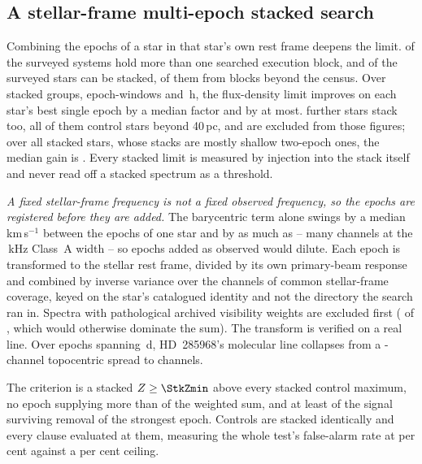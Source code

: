 \subsection{A stellar-frame multi-epoch stacked search}
\label{sec:stack}

Combining the epochs of a star in that star's own rest frame deepens the
limit. \EpMulti{} of the \NSystems{} surveyed systems hold more than one
searched execution block, and \SxStkStarCensus{} of the surveyed stars can be
stacked, \SttNStkOneEb{} of them from blocks beyond the census. Over \SyStkNGroup{} stacked groups, \SyStkNEpochComb{} epoch-windows and
\SyStkHours\,h, the flux-density limit improves on each star's best single epoch by a
median factor \SyStkGainMed{} and by \SyStkGainMax{} at most.
\SxStkStarOutside{} further stars stack too, all of them control stars beyond
40\,pc, and are excluded from those figures; over all \StkNStar{} stacked
stars, whose stacks are mostly shallow two-epoch ones, the median gain is
\StkLimitGainMed. Every
stacked limit is measured by injection into the stack itself and never read
off a stacked spectrum as a threshold.

\emph{A fixed stellar-frame frequency is not a fixed observed frequency, so
the epochs are registered before they are added.} The barycentric term alone
swings by a median \StkVcorrSwingMed\,km\,s$^{-1}$ between the epochs of one
star and by as much as \StkVcorrSwingMax{} -- many channels at the
\StkRefChanKHz\,kHz Class~A width -- so epochs added as observed would
dilute. Each epoch is transformed to the stellar rest frame,
divided by its own primary-beam response and combined by inverse variance
over the channels of common stellar-frame coverage, keyed on the star's
catalogued identity and not the directory the search ran in. Spectra with
pathological archived visibility weights are excluded first
(\StkBadWeight{} of \StkNProd, which would otherwise dominate the sum). The transform is verified on a real line. Over \StkRegNEpoch{} epochs
spanning \StkRegSpanD\,d, HD~285968's molecular line collapses from a
\StkRegTopoChan-channel topocentric spread to \StkRegStellarChan{}
channels.

The criterion is a stacked
$Z\ge\StkZmin$ above every stacked control maximum, no epoch supplying more
than \StkDomMax{} of the weighted sum, and at least \StkJkMin{} of the signal
surviving removal of the strongest epoch. Controls are stacked identically
and every clause evaluated at them, measuring the whole test's
false-alarm rate at \StkCtrlFap{} per cent against a \StkFapCeil{} per cent
ceiling.

